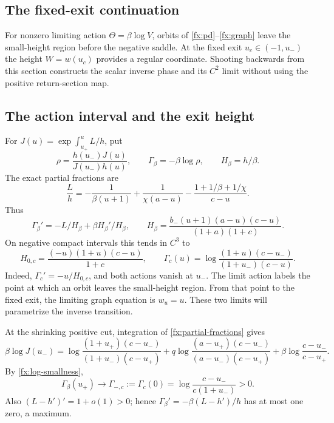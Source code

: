 \subsection{The fixed-exit continuation}
\label{sec:fixed-exit-comparison}

For nonzero limiting action $\Theta=\beta\log V$, orbits of
\eqref{fx:pd}--\eqref{fx:graph} leave the small-height region before
the negative saddle. At the fixed exit $u_c\in(-1,u_-)$ the height
$W=w(u_c)$ provides a regular coordinate. Shooting backwards from this
section constructs the scalar inverse phase and its $C^2$ limit without
using the positive return-section map.

\subsection{The action interval and the exit height}

For \(J(u)=\exp\int_{u_+}^u L/h\), put
\begin{equation}\label{fx:rho-gamma}
 \rho=\frac{h(u_-)J(u)}{J(u_-)h(u)},\qquad
 \Gamma_\beta=-\beta\log\rho,\qquad H_\beta=h/\beta .
\end{equation}
The exact partial fractions are
\begin{equation}\label{fx:partial-fractions}
 \frac Lh=-\frac1{\beta(u+1)}
       +\frac1{\chi(a-u)}
       -\frac{1+1/\beta+1/\chi}{c-u}.
\end{equation}
Thus
\begin{equation}\label{fx:gamma-derivative}
 \Gamma_\beta'=-L/H_\beta+\beta H_\beta'/H_\beta,\qquad
 H_\beta=\frac{b_-(u+1)(a-u)(c-u)}{(1+a)(1+c)} .
\end{equation}
On negative compact intervals this tends in \(C^3\) to
\begin{equation}\label{fx:limit-functions}
 H_{0,c}=\frac{(-u)(1+u)(c-u)}{1+c},\qquad
 \Gamma_c(u)=\log\frac{(1+u)(c-u_-)}{(1+u_-)(c-u)} .
\end{equation}
Indeed, \(\Gamma_c'=-u/H_{0,c}\), and both actions vanish at \(u_-\).
The limit action labels the point at which an orbit leaves the
small-height region. From that point to the fixed exit, the limiting
graph equation is \(w_u=u\). These two limits will parametrize the
inverse transition.

At the shrinking positive cut, integration of
\eqref{fx:partial-fractions} gives
\[
 \beta\log J(u_-)=
 \log\frac{(1+u_+)(c-u_-)}{(1+u_-)(c-u_+)}
 +q\log\frac{(a-u_+)(c-u_-)}{(a-u_-)(c-u_+)}
 +\beta\log\frac{c-u_-}{c-u_+}.
\]
By \eqref{fx:log-smallness},
\begin{equation}\label{fx:gamma-endpoint}
 \Gamma_\beta(u_+)\longrightarrow
 \Gamma_{-,c}:=\Gamma_c(0)=
             \log\frac{c-u_-}{c(1+u_-)}>0 .
\end{equation}
Also \((L-h')'=1+o(1)>0\); hence
\(\Gamma_\beta'=-\beta(L-h')/h\) has at most one zero, a maximum.


